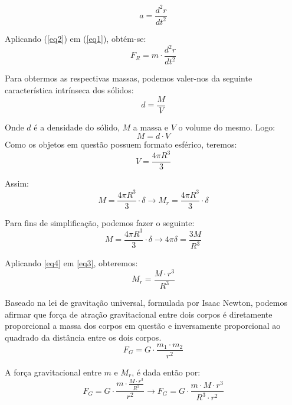 \documentclass[
	article,			%
	11pt,				%
	oneside,			%
	a4paper,			%
	english,			%
	brazil,				%
	sumario=tradicional
	]{abntex2}
\begin{document}
		\begin{equation}\label{eq2}
		a = \frac{d^{2}r}{dt^{2}}
		\end{equation}
		
		\noindent Aplicando (\ref{eq2}) em (\ref{eq1}), obtém-se:
		\begin{equation}\label{eqf}
		F_{R} = m \cdot \frac{d^{2}r}{dt^{2}}
		\end{equation}
		
		\noindent Para obtermos as respectivas massas, podemos valer-nos da seguinte característica intrínseca dos sólidos:
\begin{equation*}
	d= \frac{M}{V}
\end{equation*}

\noindent Onde $d$ é a densidade do sólido, $M$ a massa e $V$ o volume do mesmo.
Logo:
\begin{equation*}
M = d \cdot V
\end{equation*}
\noindent Como os objetos em questão possuem formato esférico, teremos:
\begin{equation*}
V = \frac{4\pi R^{3}}{3}
\end{equation*}

\noindent Assim:
\begin{equation}\label{eq3}
M = \frac{4\pi R^{3}}{3} \cdot \delta \rightarrow M_{r} = \frac{4\pi R^{3}}{3} \cdot \delta
\end{equation}

\noindent Para fins de simplificação, podemos fazer o seguinte:
\begin{equation}\label{eq4}
M = \frac{4\pi R^{3}}{3} \cdot \delta \rightarrow 4\pi \delta = \frac{3M}{R^{3}}
\end{equation}

\noindent Aplicando \eqref{eq4} em \eqref{eq3}, obteremos:
\begin{equation*}
M_{r}= \frac{M \cdot r^{3}}{R^{3}}
\end{equation*}

Baseado na lei de gravitação universal, formulada por Isaac Newton, podemos afirmar que força de atração gravitacional entre dois corpos é diretamente proporcional a massa dos corpos em questão e inversamente proporcional ao quadrado da distância entre os dois corpos.
\begin{equation*}
F_{G} = G \cdot \frac{m_{1} \cdot m_{2}}{r^{2}}
\end{equation*}

\noindent A força gravitacional entre $m$ e $M_{r}$, é dada então por:
\begin{equation*}
F_{G} = G \cdot \frac{m \cdot \frac{M \cdot r^{3}}{R^{3}}}{r^{2}} \rightarrow F_{G} = G \cdot \frac{m \cdot M \cdot r^{3}}{R^{3} \cdot r^{2}}
\end{equation*}
\end{document}
